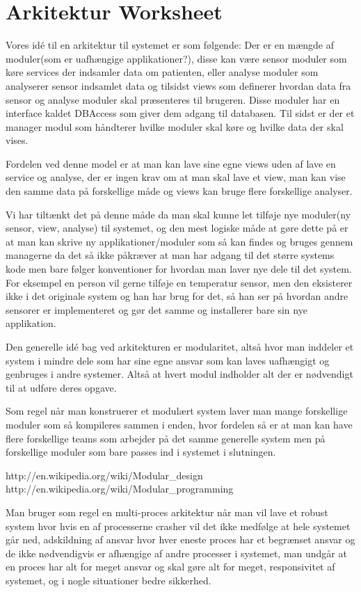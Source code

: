 \chapter{Arkitektur Worksheet}
Vores idé til en arkitektur til systemet er som følgende:
Der er en mængde af moduler(som er uafhængige applikationer?), disse kan være sensor moduler som køre services der indsamler data om patienten, eller analyse moduler som analyserer sensor indsamlet data og tilsidst views som definerer hvordan data fra sensor og analyse moduler skal præsenteres til brugeren. Disse moduler har en interface kaldet DBAccess som giver dem adgang til databasen. Til sidst er der et manager modul som håndterer hvilke moduler skal køre og hvilke data der skal vises.

Fordelen ved denne model er at man kan lave sine egne views uden af lave en service og analyse, der er ingen krav om at man skal lave et view, man kan vise den samme data på forskellige måde og views kan bruge flere forskellige analyser.

Vi har tiltænkt det på denne måde da man skal kunne let tilføje nye moduler(ny sensor, view, analyse) til systemet, og den mest logiske måde at gøre dette på er at man kan skrive ny applikationer/moduler som så kan findes og bruges gennem managerne da det så ikke påkræver at man har adgang til det større systems kode men bare følger konventioner for hvordan man laver nye dele til det system. For eksempel en person vil gerne tilføje en temperatur sensor, men den eksisterer ikke i det originale system og han har brug for det, så han ser på hvordan andre sensorer er implementeret og gør det samme og installerer bare sin nye applikation.

Den generelle idé bag ved arkitekturen er modularitet, altså hvor man inddeler et system i mindre dele som har sine egne ansvar som kan laves uafhængigt og genbruges i andre systemer. Altså at hvert modul indholder alt der er nødvendigt til at udføre deres opgave.

Som regel når man konstruerer et modulært system laver man mange forskellige moduler som så kompileres sammen i enden, hvor fordelen så er at man kan have flere forskellige teams som arbejder på det samme generelle system men på forskellige moduler som bare passes ind i systemet i slutningen. 

http://en.wikipedia.org/wiki/Modular_design
http://en.wikipedia.org/wiki/Modular_programming

Man bruger som regel en multi-proces arkitektur når man vil lave et robust system hvor hvis en af processerne crasher vil det ikke medfølge at hele systemet går ned, adskildning af ansvar hvor hver eneste proces har et begrænset ansvar og de ikke nødvendigvis er afhængige af andre processer i systemet, man undgår at en proces har alt for meget ansvar og skal gøre alt for meget, responsivitet af systemet, og i nogle situationer bedre sikkerhed.

